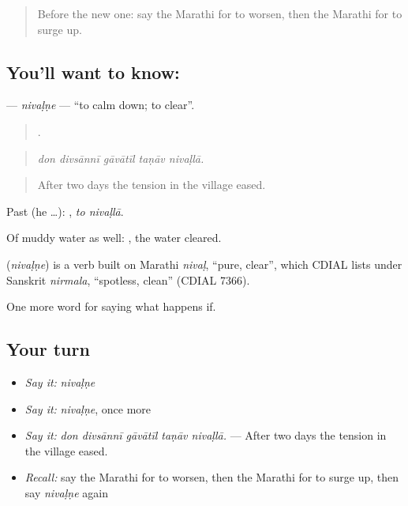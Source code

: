 \label{lesson:MR-C385-nivalne}



\begin{quote}
Before the new one: say the Marathi for to worsen, then the Marathi for to surge up.
\end{quote}

\subsection*{You'll want to know: }
\textbf{} — \emph{nivaḷṇe} — \textquotedblleft{}to calm down; to clear\textquotedblright{}.

\begin{quote}
    .
\end{quote}

\begin{quote}
\emph{don divsānnī gāvātīl taṇāv nivaḷlā.}
\end{quote}

\begin{quote}
After two days the tension in the village eased.
\end{quote}

Past (he …):  , \emph{to nivaḷlā}.

Of muddy water as well:  , the water cleared.

\begin{cousinweb}
\textbf{} (\emph{nivaḷṇe}) is a verb built on Marathi \emph{nivaḷ}, \textquotedblleft{}pure, clear\textquotedblright{}, which CDIAL lists under Sanskrit \emph{nirmala}, \textquotedblleft{}spotless, clean\textquotedblright{} (CDIAL 7366).
\end{cousinweb}

\begin{grammarlens}[title={What you've built}]
One more word for saying what happens if.
\end{grammarlens}

\subsection*{Your turn}
\begin{itemize}
\raggedright
  \item \emph{Say it:} \emph{nivaḷṇe}
  \item \emph{Say it:} \emph{nivaḷṇe}, once more
  \item \emph{Say it:} \emph{don divsānnī gāvātīl taṇāv nivaḷlā.} — After two days the tension in the village eased.
  \item \emph{Recall:} say the Marathi for to worsen, then the Marathi for to surge up, then say \emph{nivaḷṇe} again
\end{itemize}

